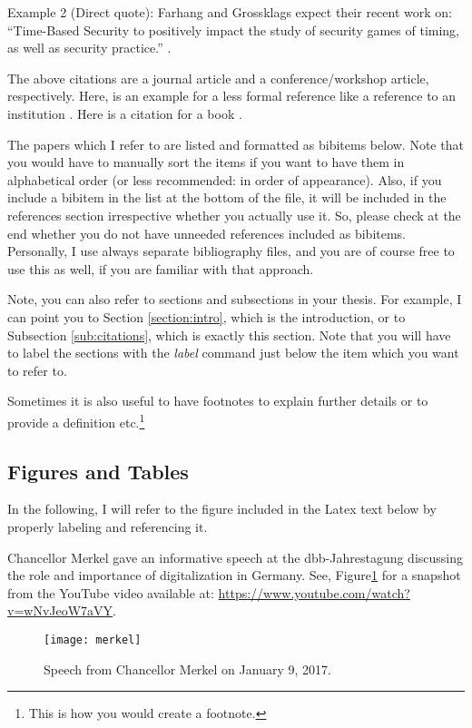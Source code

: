 \documentclass[runningheads,a4paper]{llncs}
\begin{document}
Example 2 (Direct quote): Farhang and Grossklags expect their recent work on: ``Time-Based Security to positively impact the study of
security games of timing, as well as security practice.'' \cite{Farhang2017}.

The above citations are a journal article and a conference/workshop article, respectively. Here, is an example for a less formal reference like a reference to an institution \cite{CenterBiotech}. Here is a citation for a book \cite{Foster1999}.

The papers which I refer to are listed and formatted as bibitems below. Note that you would have to manually sort the items if you  want to have them in alphabetical order (or less recommended: in order of appearance). Also, if you include a bibitem in the list at the bottom of the file, it will be included in the references section irrespective whether you actually use it. So, please check at the end whether you do not have unneeded references included as bibitems. Personally, I use always separate bibliography files, and you are of course free to use this as well, if you are familiar with that approach.

Note, you can also refer to sections and subsections in your thesis. For example, I can point you to Section \ref{section:intro}, which is the introduction, or to Subsection \ref{sub:citations}, which is exactly this section. Note that you will have to label the sections with the \textit{label} command just below the item which you want to refer to.

Sometimes it is also useful to have footnotes to explain further details or to provide a definition etc.\footnote{This is how you would create a footnote.}

\subsection{Figures and Tables}

In the following, I will refer to the figure included in the Latex text below by properly labeling and referencing it.

Chancellor Merkel gave an informative speech at the dbb-Jahrestagung discussing the role and importance of digitalization in Germany. See, Figure\ref{fig:merkel} for a snapshot from the YouTube video available at: \url{https://www.youtube.com/watch?v=wNvJeoW7aVY}. 

\begin{figure}
\centering
\texttt{[image: merkel]}
\caption{Speech from Chancellor Merkel on January 9, 2017.}
\label{fig:merkel}
\end{figure}
\end{document}
